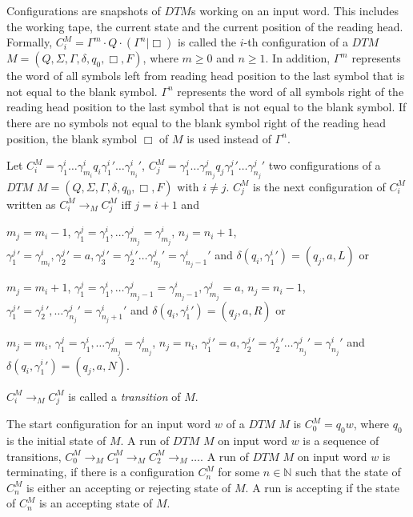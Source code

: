 Configurations are snapshots of $\mathit{DTM}$s working on an input word. This includes the working tape, the current
state and the current position of the reading head. Formally, $C_i^M = \Gamma^m \cdot Q \cdot (\Gamma^n | \Box)$
is called the $i$-th configuration of a $\mathit{DTM}$ $M = (Q, \Sigma, \Gamma, \delta, q_0, \Box, F)$, where $m \geq
0$ and $n \geq 1$. In addition, $\Gamma^m$ represents the word of all symbols left
from reading head position to the last symbol that is not equal to the blank symbol. $\Gamma^n$ represents the word
of all symbols right of the reading head position to the last symbol that is not equal to the blank symbol. If there
are no symbols not equal to the blank symbol right of the reading head position, the blank symbol $\Box$ of $M$ is used
instead of $\Gamma^n$.

\begin{definition}
    Let $C_i^M = \gamma_1^i\dots\gamma_{m_i}^i{q_i}{\gamma_1^i}'\dots{\gamma_{n_i}^i}'$, $C_j^M =
    \gamma_1^j\dots\gamma_{m_j}^j{q_j}{\gamma_1^j}'\dots{\gamma_{n_j}^j}'$ two configurations of a $\mathit{DTM}$ $M = (Q, \Sigma,
    \Gamma,
    \delta, q_0, \Box, F)$ with $i \neq j$. $C_j^M$ is the next configuration
    of $C_i^M$ written as $C_i^M \rightarrow_M C_j^M$ iff $j = i + 1$ and
    \begin{compactitem}
        \item $m_j = m_i - 1$, $\gamma_1^j = \gamma_1^i, \dots \gamma_{m_j}^j = \gamma_{m_j}^i$, $n_j = n_i + 1$,
        ${\gamma_1^j}' = \gamma_{m_i}^i, {\gamma_2^j}' = a, {\gamma_3^j}' = {\gamma_2^i}' \dots {\gamma_{n_j}^j}' =
        {\gamma_{{n_j}- 1}^i}'$ and $\delta(q_i, {\gamma_1^i}') = (q_j, a, L)$ or
        \item $m_j = m_i + 1$, $\gamma_1^j = \gamma_1^i, \dots \gamma_{m_j-1}^j = \gamma_{m_j-1}^i, \gamma_{m_j}^j
        = a$, $n_j = n_i - 1$, ${\gamma_1^j}' = {\gamma_2^i}', \dots {\gamma_{n_j}^j}' = {\gamma_{{n_j}+1}^i}'$ and
$\delta (q_i, {\gamma_1^i}') = (q_j, a, R)$ or
        \item $m_j = m_i$, $\gamma_1^j = \gamma_1^i, \dots \gamma_{m_j}^j = \gamma_{m_j}^i$, $n_j = n_i$, ${\gamma_1^j}'
= a, {\gamma_2^j}' = {\gamma_2^i}' \dots {\gamma_{n_j}^j}' = {\gamma_{n_j}^i}'$ and $\delta
        (q_i, {\gamma_1^i}') = (q_j, a, N)$.
    \end{compactitem}
    $C_i^M \rightarrow_M C_j^M$ is called a \emph{transition} of $M$.
\end{definition}

The start configuration for an input word $w$ of a $\mathit{DTM}$ $M$ is $C_0^M = q_0w$, where $q_0$ is the
initial state of $M$. A run of $\mathit{DTM}$ $M$ on input word $w$ is a sequence of transitions, $C_0^M
\rightarrow_M C_1^M \rightarrow_M C_2^M \rightarrow_M \dots$. A run of $\mathit{DTM}$ $M$ on input word $w$ is
terminating, if there is a configuration $C_n^M$ for some $n \in \mathbb{N}$ such that the state of $C_n^M$ is either
an accepting or rejecting state of $M$. A run is accepting if the state of $C_n^M$ is an accepting state of $M$.

